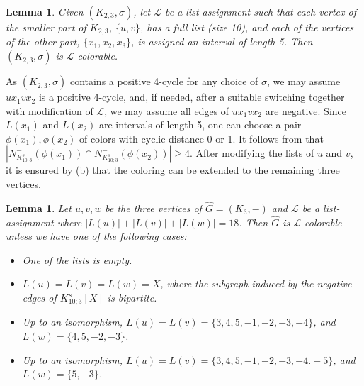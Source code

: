 \documentclass[11pt,a4paper]{article}
\makeatletter
\renewenvironment{proof}[1][\proofname]{\par
	\pushQED{\qed}%
	\normalfont \topsep6\p@\@plus6\p@\relax
	\trivlist
	\item[\hskip\labelsep
	\bfseries
	#1\@addpunct{.}]\ignorespaces
}{%
	\popQED\endtrivlist\@endpefalse
}
\newtheorem{lemma}[theorem]{Lemma}
\theoremstyle{definition}
\makeatother
\begin{document}
	
	
	
	\begin{lemma}\label{lem:K_{2,3}}
		Given $(K_{2,3}, \sigma)$, let $\mathcal{L}$ be a list assignment such that each vertex of the smaller part of $K_{2,3}$, $\{u,v\}$, has a full list (size 10), and each of the vertices of the other part, $\{x_{1}, x_{2}, x_{3}\}$, is assigned an interval of length 5. Then  $(K_{2,3}, \sigma)$ is $\mathcal{L}$-colorable. 
	\end{lemma}
	
	\begin{proof}
		As $(K_{2,3}, \sigma)$ contains a positive 4-cycle for any choice of $\sigma$, we may assume $ux_{1}vx_{2}$ is a positive 4-cycle, and, if needed, after a suitable switching together with modification of $\mathcal{L}$, we may assume all edges of $ux_{1}vx_{2}$ are negative. Since $L(x_{1})$ and $L(x_{2})$ are intervals of length 5, one can choose a pair $\phi(x_{1}), \phi(x_{2})$ of colors with cyclic distance 0 or 1. It follows from   that $|N^{-}_{K_{10;3}^{s}}(\phi(x_{1}))\cap N^{-}_{K_{10;3}^{s}}(\phi(x_{2}))| \geq 4$. After modifying the lists of $u$ and $v$, it is ensured by (b) that the coloring can be extended to the remaining three vertices.
	\end{proof}
	


	\begin{lemma}\label{lem:NegativeTirnagle}
		Let $u,v,w$ be the three vertices of $\widehat{G}=(K_3,-)$ and $\mathcal{L}$ be a list-assignment where $|L(u)|+|L(v)|+|L(w)|=18$. Then  $\widehat{G}$ is $\mathcal{L}$-colorable unless we have one of the following cases: 
		
		\begin{itemize}
			\item[(1)] One of the lists is empty.
			
			\item[(2)] $L(u)=L(v)=L(w)=X$, where the subgraph induced by the negative edges of $K_{10;3}^{s}[X]$ is bipartite.
			
			\item[(3)] Up to an isomorphism, $L(u)=L(v)=\{3,4,5,-1,-2,-3,-4\}$, and $L(w)=\{4,5,-2,-3\}$.
			
			\item[(4)] Up to an isomorphism, $L(u)=L(v)=\{3,4,5,-1,-2,-3,-4. -5\}$, and $L(w)=\{5,-3\}$.
			
		\end{itemize}	
		
	\end{lemma}
	
\end{document}
